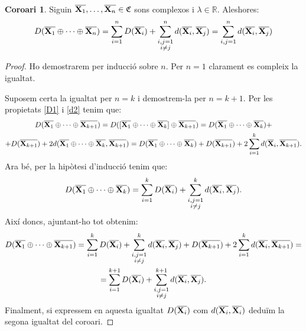 \documentclass{article}
\theoremstyle{definition}
\newtheorem{corollary}[definition]{Coro\lgem ari}
\newcommand{\0}{\ensuremath{\vb{0}}}
\newcommand{\X}{\ensuremath{\vb{X}}}
\newcommand{\RR}{\ensuremath{\mathbb{R}}} %
\begin{document}
\begin{corollary}
    Siguin $\overline{\X_1},\ldots,\overline{\X_n}\in\mathfrak{C}$ sons complexos i $\lambda\in\RR$. Aleshores: $$D(\overline{\X_1}\oplus\cdots\oplus\overline{\X_n})=\sum_{i=1}^nD(\overline{\X_i})+\sum_{\substack{i,j=1\\i\ne j}}^nd(\overline{\X_i},\overline{\X_j})=\sum_{i,j=1}^nd(\overline{\X_i},\overline{\X_j})$$
\end{corollary}
\begin{proof}
    Ho demostrarem per inducció sobre $n$. Per $n=1$ clarament es compleix la igualtat.\par Suposem certa la igualtat per $n=k$ i demostrem-la per $n=k+1$. Per les propietats \ref{D1} i \ref{d2} tenim que:
    \begin{multline*}
        D(\overline{\X_1}\oplus\cdots\oplus\overline{\X_{k+1}})=D([\overline{\X_1}\oplus\cdots\oplus\overline{\X_k}]\oplus\overline{\X_{k+1}})=D(\overline{\X_1}\oplus\cdots\oplus\overline{\X_k})+\\+D(\overline{\X_{k+1}})+2d(\overline{\X_1}\oplus\cdots\oplus\overline{\X_k},\overline{\X_{k+1}})=D(\overline{\X_1}\oplus\cdots\oplus\overline{\X_k})+D(\overline{\X_{k+1}})+2\sum_{i=1}^kd(\overline{\X}_i,\overline{\X_{k+1}}).
    \end{multline*}
    Ara bé, per la hipòtesi d'inducció tenim que:
    $$D(\overline{\X_1}\oplus\cdots\oplus\overline{\X_k})=\sum_{i=1}^kD(\overline{\X_i})+\sum_{\substack{i,j=1\\i\ne j}}^kd(\overline{\X_i},\overline{\X_j}).$$ Així doncs, ajuntant-ho tot obtenim:
    \begin{multline*}
        D(\overline{\X_1}\oplus\cdots\oplus\overline{\X_{k+1}})=\sum_{i=1}^kD(\overline{\X_i})+\sum_{\substack{i,j=1\\i\ne j}}^kd(\overline{\X_i},\overline{\X_j})+D(\overline{\X_{k+1}})+2\sum_{i=1}^kd(\overline{\X_i},\overline{\X_{k+1}})=\\=\sum_{i=1}^{k+1}D(\overline{\X_i})+\sum_{\substack{i,j=1\\i\ne j}}^{k+1}d(\overline{\X_i},\overline{\X_j}).
    \end{multline*}
    Finalment, si expressem en aquesta igualtat $D(\overline{\X_i})$ com $d(\overline{\X_i},\overline{\X_i})$ deduïm la segona igualtat del coro\lgem ari.
\end{proof}
\end{document}
